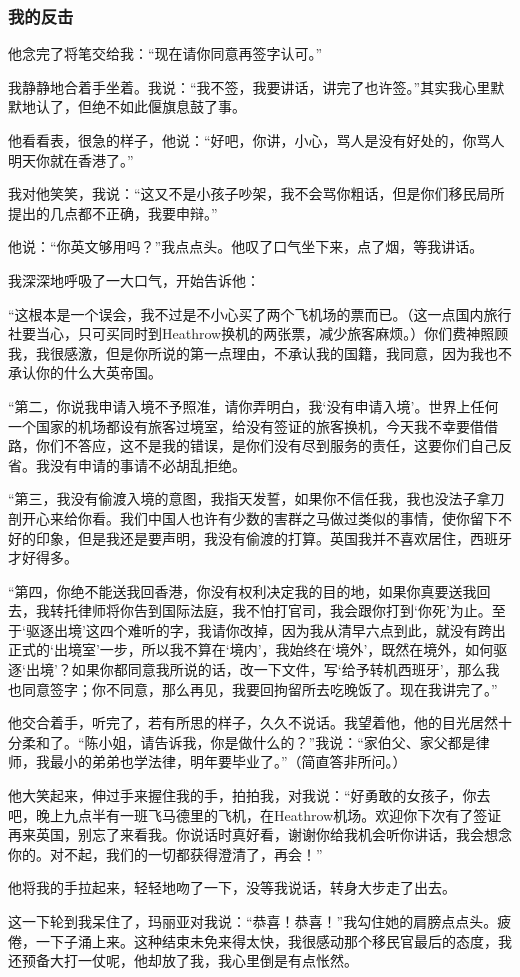 \subsubsection*{我的反击}
\par 他念完了将笔交给我：“现在请你同意再签字认可。”
\par 我静静地合着手坐着。我说：“我不签，我要讲话，讲完了也许签。”其实我心里默默地认了，但绝不如此偃旗息鼓了事。
\par 他看看表，很急的样子，他说：“好吧，你讲，小心，骂人是没有好处的，你骂人明天你就在香港了。”
\par 我对他笑笑，我说：“这又不是小孩子吵架，我不会骂你粗话，但是你们移民局所提出的几点都不正确，我要申辩。”
\par 他说：“你英文够用吗？”我点点头。他叹了口气坐下来，点了烟，等我讲话。
\par 我深深地呼吸了一大口气，开始告诉他：
\par “这根本是一个误会，我不过是不小心买了两个飞机场的票而已。（这一点国内旅行社要当心，只可买同时到Heathrow换机的两张票，减少旅客麻烦。）你们费神照顾我，我很感激，但是你所说的第一点理由，不承认我的国籍，我同意，因为我也不承认你的什么大英帝国。
\par “第二，你说我申请入境不予照准，请你弄明白，我‘没有申请入境’。世界上任何一个国家的机场都设有旅客过境室，给没有签证的旅客换机，今天我不幸要借借路，你们不答应，这不是我的错误，是你们没有尽到服务的责任，这要你们自己反省。我没有申请的事请不必胡乱拒绝。
\par “第三，我没有偷渡入境的意图，我指天发誓，如果你不信任我，我也没法子拿刀剖开心来给你看。我们中国人也许有少数的害群之马做过类似的事情，使你留下不好的印象，但是我还是要声明，我没有偷渡的打算。英国我并不喜欢居住，西班牙才好得多。
\par “第四，你绝不能送我回香港，你没有权利决定我的目的地，如果你真要送我回去，我转托律师将你告到国际法庭，我不怕打官司，我会跟你打到‘你死’为止。至于‘驱逐出境’这四个难听的字，我请你改掉，因为我从清早六点到此，就没有跨出正式的‘出境室’一步，所以我不算在‘境内’，我始终在‘境外’，既然在境外，如何驱逐‘出境’？如果你都同意我所说的话，改一下文件，写‘给予转机西班牙’，那么我也同意签字；你不同意，那么再见，我要回拘留所去吃晚饭了。现在我讲完了。”
\par 他交合着手，听完了，若有所思的样子，久久不说话。我望着他，他的目光居然十分柔和了。“陈小姐，请告诉我，你是做什么的？”我说：“家伯父、家父都是律师，我最小的弟弟也学法律，明年要毕业了。”（简直答非所问。）
\par 他大笑起来，伸过手来握住我的手，拍拍我，对我说：“好勇敢的女孩子，你去吧，晚上九点半有一班飞马德里的飞机，在Heathrow机场。欢迎你下次有了签证再来英国，别忘了来看我。你说话时真好看，谢谢你给我机会听你讲话，我会想念你的。对不起，我们的一切都获得澄清了，再会！”
\par 他将我的手拉起来，轻轻地吻了一下，没等我说话，转身大步走了出去。
\par 这一下轮到我呆住了，玛丽亚对我说：“恭喜！恭喜！”我勾住她的肩膀点点头。疲倦，一下子涌上来。这种结束未免来得太快，我很感动那个移民官最后的态度，我还预备大打一仗呢，他却放了我，我心里倒是有点怅然。
